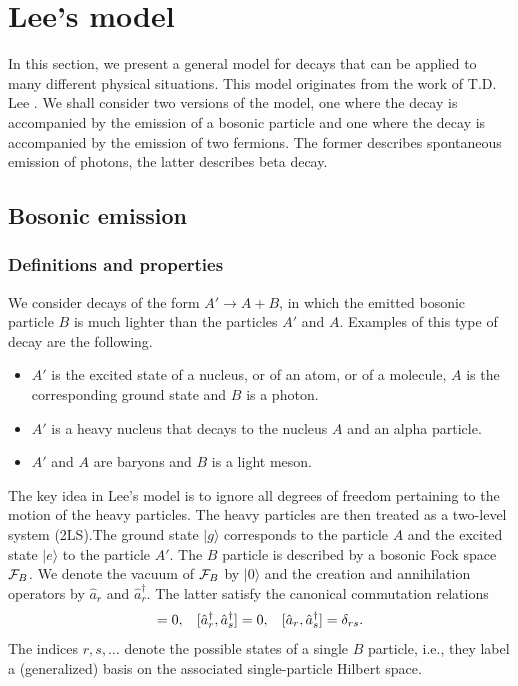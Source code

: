 \documentclass[12pt]{article}
\numberwithin{equation}{section}
\begin{document}
\section{Lee's model}
In this section, we present a general model for decays that can be applied to many different physical situations. This model originates from the work of T.D. Lee \cite{Lee}. We shall consider two versions of the model, one where the decay is accompanied by the emission of a bosonic particle and one where the decay is accompanied by the emission of two fermions. The former describes  spontaneous emission of photons, the latter describes beta decay.
\subsection{Bosonic emission}
\subsubsection{Definitions and properties}
We consider decays of the form $A' \rightarrow A + B$, in which the emitted bosonic particle $B$ is much lighter than the particles $A'$ and $A$. Examples of this type of decay are the following.
\begin{itemize}
\item  $A'$ is the excited state of a nucleus, or of an atom, or of a molecule, $A$ is the corresponding ground state and   $B$ is a photon.
\item  $A'$ is a heavy nucleus that decays to  the nucleus $A$ and an alpha particle.
\item  $A'$ and $A$ are baryons and  $B$ is a light meson.
\end{itemize}
The key idea in Lee's model is to ignore all degrees of freedom pertaining to the motion of the  heavy particles. The heavy particles are then treated as a two-level system (2LS).The ground state $|g\rangle$ corresponds to the particle $A$ and the excited state $|e\rangle$ to the particle   $A'$. The $B$ particle is described by a bosonic Fock space ${\cal F}_B$. We   denote the vacuum of ${\cal F}_B$ by
  $|0\rangle$ and the creation and annihilation operators by $\hat{a}_r$ and $\hat{a}^{\dagger}_r$. The latter satisfy the canonical commutation relations
  \begin{eqnarray}
  [\hat{a}_r, \hat{a}_s] = 0, \hspace{0,3cm}   [\hat{a}^{\dagger}_r, \hat{a}^{\dagger}_s] = 0, \hspace{0,3cm}    [\hat{a}_r, \hat{a}^{\dagger}_s] = \delta_{rs}.
  \end{eqnarray}
  The indices $r, s, \ldots$ denote the possible states of a single $B$ particle, i.e., they label a (generalized) basis on the associated single-particle  Hilbert space.
\end{document}
